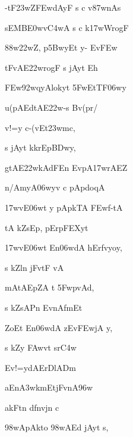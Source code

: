 \ujvers\dnnemsloka 
{\dn -tF\323wZ\3FEwdAyF s c v\387wnAs}
\dontdisplaylinenum

\dnnemslokab 
{\dn sEMB\3E0wv\3C4wA s c k\317wWrogF \dandadn\dontdisplaylinenum}

\dnnemslokac 
{\dn {}\388w\?\322wZ, p\35BwyEt y- Ev\3FEw\2}
\dontdisplaylinenum

\dnnemslokad 
{\dn tFv\5AE\322wrogF s  jAyt\? Eh \vegdn\dontdisplaylinenum}


\ujvers\dnnemsloka 
{\dn \3FEw\392w\?qyAlokyt\? \35FwEtTF\306wy}
\dontdisplaylinenum

\dnnemslokab 
{\dn u(pAEdtAE\322w-s Bv\?(pr/ \dandadn\dontdisplaylinenum}

\dnnemslokac 
{\dn v\4!=y c-(vEt\323wmc,}
\dontdisplaylinenum

\dnnemslokad 
{\dn s jAyt\? k\?krEp\3BDwy, \vegdn\dontdisplaylinenum}


\ujvers\dnnemsloka 
{\dn gtA\0E\322wkAdFEn EvpA\317wrAEZ}
\dontdisplaylinenum

\dnnemslokab 
{\dn n\?/AmyA\306wy\?v c pApdoqA \dandadn\dontdisplaylinenum}

\dnnemslokac 
{\dn {}\317wvE\306wt y\? pApkTA\2 \3FEwf-tA\2}
\dontdisplaylinenum

\dnnemslokad 
{\dn tA\2 kZ\0sEp\0, pErpFEXy\?t \vegdn\dontdisplaylinenum}


\ujvers\dnnemsloka 
{\dn {}\317wvE\306wt En\306wdA\2 hErfv\0yoy\0,}
\dontdisplaylinenum

\dnnemslokab 
{\dn s kZ\0l\?n  jFvtF vA \dandadn\dontdisplaylinenum}

\dnnemslokac 
{\dn mAtAEpZA\2 t\? \35FwpvAd,}
\dontdisplaylinenum

\dnnemslokad 
{\dn s kZ\0sAP\?n EvnAfm\?Et \vegdn\dontdisplaylinenum}


\ujvers\dnnemsloka 
{\dn {}ZoEt En\306wdA\2 zEv\3FEwjA y,}
\dontdisplaylinenum

\dnnemslokab 
{\dn s kZ\0y\2 \3FAwvt\? sr\3C4w \dandadn\dontdisplaylinenum}

\dnnemslokac 
{\dn Ev!=ydAErD\5lADm\?}
\dontdisplaylinenum

\dnnemslokad 
{\dn aEn\3A3wkm\0EtjFvnA\396w \vegdn\dontdisplaylinenum}


\ujvers\dnnemsloka 
{\dn akFt\0n\2 df\0nvj\0n\2 c}
\dontdisplaylinenum

\dnnemslokab 
{\dn \398wApAkto \398wAEd jAyt\? s, \dandadn\dontdisplaylinenum}

